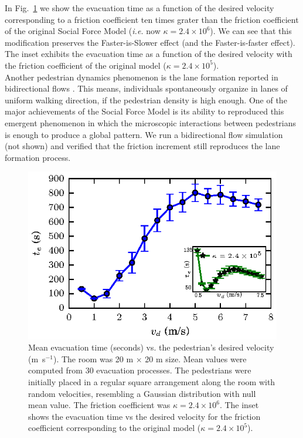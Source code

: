 \documentclass[preprint,12pt]{elsarticle}
\begin{document}
In Fig.~\ref{fis} we show the evacuation time as a function of the desired velocity corresponding to a friction coefficient ten times grater than the friction coefficient of the original Social Force Model (\textit{i.e.} now $\kappa=2.4\times 10^{6}$). We can see that this modification preserves the Faster-is-Slower effect (and the Faster-is-faster effect). The inset exhibits the evacuation time as a function of the desired velocity with the friction coefficient of the original model ($\kappa=2.4\times 10^{5}$).\\

Another pedestrian dynamics phenomenon is the lane formation reported in bidirectional flows \cite{feliciani1,helbing5,guo1,qiao1}. This means, individuals spontaneously organize in lanes of uniform walking direction, if the pedestrian density is high enough. One of the major achievements of the Social Force Model is its ability to reproduced this emergent phenomenon in which the microscopic interactions between pedestrians is enough to produce a global pattern. We run a bidirectional flow simulation (not shown) and verified that the friction increment still reproduces the lane formation process.\\  

\begin{figure}[htbp!]
\centering
\includegraphics[width=0.7\columnwidth]
{./fis_kx10.eps}
\caption{\label{fis} Mean evacuation time (seconds) vs. the pedestrian’s desired velocity (m~s$^{-1}$). The room was 20 m $\times$ 20 m size. Mean values were computed from 30 evacuation processes. The pedestrians were initially placed in a regular square arrangement along the room with random velocities, resembling a Gaussian distribution with null mean value. The friction coefficient was $\kappa=2.4\times10^{6}$. The inset shows the evacuation time vs the desired velocity for the friction coefficient corresponding to the original model ($\kappa=2.4\times10^{5}$).  }
\end{figure}
\end{document}
